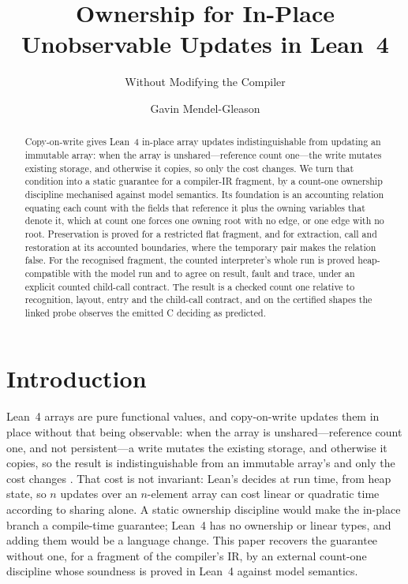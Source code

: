 \documentclass[a4paper,UKenglish,cleveref]{lipics-v2021}
\title{Ownership for In-Place Unobservable Updates in Lean~4}
\subtitle{Without Modifying the Compiler}
\author{Gavin Mendel-Gleason}{Scidonia Limited}{gavin@scidonia.ai}{}{}
\begin{document}
\maketitle

\begin{abstract}
Copy-on-write gives Lean~4 in-place array updates indistinguishable from updating
an immutable array: when the array is unshared---reference count one---the write
mutates existing storage, and otherwise it copies, so only the cost changes. We
turn that condition
into a static guarantee for a compiler-IR fragment, by a count-one
ownership discipline mechanised against model semantics. Its foundation is an accounting relation equating each count
with the fields that reference it plus the owning variables that denote it, which
at count one forces one owning root with no edge, or one edge with no root.
Preservation is proved for a restricted flat fragment, and for extraction, call
and restoration at its accounted boundaries, where the temporary
pair makes the relation false. For the recognised fragment, the counted
interpreter's whole run is
proved heap-compatible with the model run and to agree on result, fault and trace,
under an explicit counted child-call contract. The result is a checked
count one relative to recognition, layout, entry and the child-call contract, and
on the certified shapes the linked probe observes the emitted C deciding as
predicted.
\end{abstract}

\section{Introduction}\label{sec:intro}

Lean~4 arrays are pure functional values, and copy-on-write updates them in place
without that being observable: when the array is unshared---reference count one,
and not persistent---a write mutates the existing storage, and otherwise it
copies, so the result is indistinguishable from an immutable array's and only the
cost changes \cite{lean4,perceus,countingbeans}. That cost is not invariant: Lean's
 decides at run time, from heap state, so $n$ updates
over an $n$-element array can cost linear or quadratic time according to sharing
alone. A static ownership discipline would
make the in-place branch a compile-time guarantee; Lean~4 has no ownership or
linear types, and adding them would be a language change. This paper recovers the
guarantee without one, for a fragment of the compiler's IR, by an external
count-one discipline whose soundness is proved in Lean~4 against model semantics.
\end{document}
